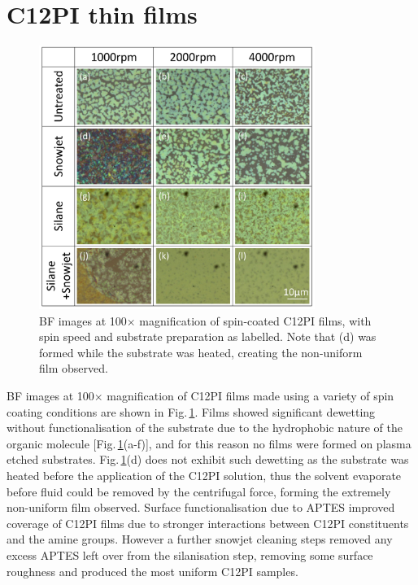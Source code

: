 \section{C12PI thin films}
\begin{figure}[ht] 
\centering    
\includegraphics[width=0.8\textwidth]{Fig1}
\caption{BF images at 100$\times$ magnification of spin-coated C12PI films, with spin speed and substrate preparation as labelled. Note that (d) was formed while the substrate was heated, creating the non-uniform film observed.}
\label{4Fig1}
\end{figure}
BF images at 100$\times$ magnification of C12PI films made using a variety of spin coating conditions are shown in Fig.\,\ref{4Fig1}. Films showed significant dewetting without functionalisation of the substrate due to the hydrophobic nature of the organic molecule [Fig.\,\ref{4Fig1}(a-f)], and for this reason no films were formed on plasma etched substrates. Fig.\,\ref{4Fig1}(d) does not exhibit such dewetting as the substrate was heated before the application of the C12PI solution, thus the solvent evaporate before fluid could be removed by the centrifugal force, forming the extremely non-uniform film observed. Surface functionalisation due to APTES improved coverage of C12PI films due to stronger interactions between C12PI constituents and the amine groups. However a further snowjet cleaning steps removed any excess APTES left over from the silanisation step, removing some surface roughness and produced the most uniform C12PI samples.

